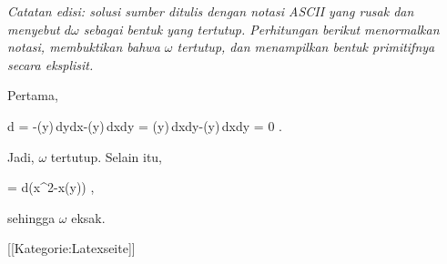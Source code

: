 \textit{Catatan edisi: solusi sumber ditulis dengan notasi ASCII yang rusak
dan menyebut $d\omega$ sebagai bentuk yang tertutup. Perhitungan berikut
menormalkan notasi, membuktikan bahwa $\omega$ tertutup, dan menampilkan
bentuk primitifnya secara eksplisit.}

Pertama,

\mavergleichskettealign
{\vergleichskettealign
{d\omega
}
{ =} { -\cos(y)\,dy\wedge dx-\cos(y)\,dx\wedge dy
}
{ =} { \cos(y)\,dx\wedge dy-\cos(y)\,dx\wedge dy
}
{ =} {0
}
{ } {}
}
{}
{}{.}

Jadi, $\omega$ tertutup. Selain itu,

\mavergleichskettedisp
{\vergleichskette
{\omega
}
{ =} {d\left(x^2-x\sin(y)\right)
}
{ } {
}
{ } {
}
{ } {
}
}
{}{}{,}

sehingga $\omega$ eksak.

 [[Kategorie:Latexseite]]
